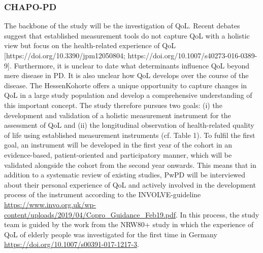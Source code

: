 \subsubsection{\acl{CHAPO-PD}}
\label{questionnaires:chapo}
The backbone of the study will be the investigation of QoL. Recent debates suggest that established measurement tools do not capture QoL with a holistic view but focus on the health-related experience of QoL [https://doi.org/10.3390/jpm12050804; https://doi.org/10.1007/s40273-016-0389-9]. Furthermore, it is unclear to date what determinants influence QoL beyond mere disease in PD. It is also unclear how QoL develops over the course of the disease. The HessenKohorte offers a unique opportunity to capture changes in QoL in a large study population and develop a comprehensive understanding of this important concept. The study therefore pursues two goals: (i) the development and validation of a holistic measurement instrument for the assessment of QoL and (ii) the longitudinal observation of health-related quality of life using established measurement instruments (cf. Table 1). 
To fulfil the first goal, an instrument will be developed in the first year of the cohort in an evidence-based, patient-oriented and participatory manner, which will be validated alongside the cohort from the second year onwards.  This means that in addition to a systematic review of existing studies, PwPD will be interviewed about their personal experience of QoL and actively involved in the development process of the instrument according to the INVOLVE-guideline \url{https://www.invo.org.uk/wp-content/uploads/2019/04/Copro_Guidance_Feb19.pdf}. In this process, the study team is guided by the work from the NRW80+ study in which the experience of QoL of elderly people was investigated for the first time in Germany \url{https://doi.org/10.1007/s00391-017-1217-3}.

